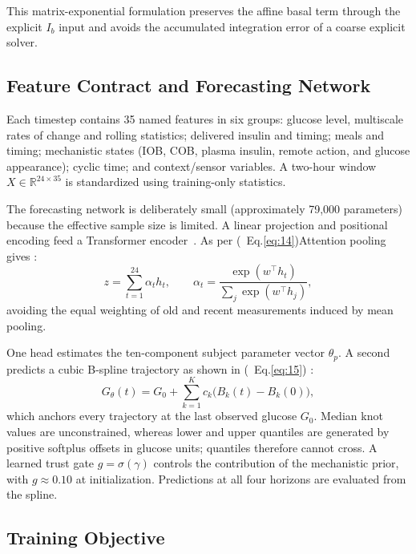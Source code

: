 \documentclass[journal]{IEEEtran}
\begin{document}
This matrix-exponential formulation preserves the affine basal term through the explicit $I_b$ input and avoids the accumulated integration error of a coarse explicit solver.

\subsection{Feature Contract and Forecasting Network}

Each timestep contains 35 named features in six groups: glucose level, multiscale rates of change and rolling statistics; delivered insulin and timing; meals and timing; mechanistic states (IOB, COB, plasma insulin, remote action, and glucose appearance); cyclic time; and context/sensor variables. A two-hour window $X \in \mathbb{R}^{24 \times 35}$ is standardized using training-only statistics.

The forecasting network is deliberately small (approximately 79,000 parameters) because the effective sample size is limited. A linear projection and positional encoding feed a Transformer encoder~\cite{ref38}. As per (\ Eq.\eqref{eq:14})Attention pooling gives :
\begin{equation}
z = \sum_{t=1}^{24} \alpha_t h_t, \qquad \alpha_t = \frac{\exp(w^\top h_t)}{\sum_j \exp(w^\top h_j)},
\label{eq:14}
\end{equation}
avoiding the equal weighting of old and recent measurements induced by mean pooling.

One head estimates the ten-component subject parameter vector $\theta_p$. A second predicts a cubic B-spline trajectory as shown in (\ Eq.\eqref{eq:15}) :
\begin{equation}
G_\theta(t) = G_0 + \sum_{k=1}^{K} c_k \big(B_k(t) - B_k(0)\big),
\label{eq:15}
\end{equation}
which anchors every trajectory at the last observed glucose $G_0$. Median knot values are unconstrained, whereas lower and upper quantiles are generated by positive softplus offsets in glucose units; quantiles therefore cannot cross. A learned trust gate $g = \sigma(\gamma)$ controls the contribution of the mechanistic prior, with $g \approx 0.10$ at initialization. Predictions at all four horizons are evaluated from the spline.

\subsection{Training Objective}
\end{document}
